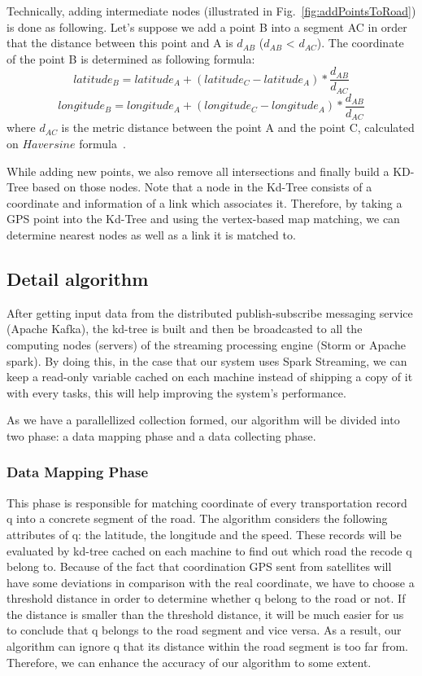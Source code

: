 \documentclass{acm_proc_article-sp}
\begin{document}
Technically, adding intermediate nodes (illustrated in Fig.~\ref{fig:addPointsToRoad}) is done as following. Let's suppose we add a point B into a segment AC in order that the distance between this point and A is $d_{AB}$ ($d_{AB}$ < $d_{AC}$). The coordinate of the point B is determined as following formula:
\[ latitude_{B} = latitude_{A} + (latitude_{C} - latitude_{A}) \ast \frac{d_{AB}}{d_{AC}}\]
\[ longitude_{B} = longitude_{A} + (longitude_{C} - longitude_{A}) \ast \frac{d_{AB}}{d_{AC}}\]
where $d_{AC}$ is the metric distance between the point A and the point C, calculated on $Haversine$ formula~\cite{haversineweb}.

While adding new points, we also remove all intersections and finally build a KD-Tree based on those nodes. Note that a node in the Kd-Tree consists of a coordinate and information of a link which associates it. Therefore, by taking a GPS point into the Kd-Tree and using the vertex-based map matching, we can determine nearest nodes as well as a link it is matched to.
	
\subsection{Detail algorithm}
		
After getting input data from the distributed publish-subscribe messaging service (Apache Kafka), the kd-tree is built and then be broadcasted to all the computing nodes (servers) of the streaming processing engine (Storm or Apache spark). By doing this, in the case that our system uses Spark Streaming, we can keep a read-only variable cached on each machine instead of shipping a copy of it with every tasks, this will help improving the system's performance.
	
As we have a parallellized collection formed, our algorithm will be divided into two phase: a data mapping phase and a data collecting phase. 

\subsubsection{Data Mapping Phase} 

This phase is responsible for matching coordinate of every transportation record q into a concrete segment of the road. The algorithm considers the following attributes of q: the latitude, the longitude and the speed. These records will be evaluated by kd-tree cached on each machine to find out which road the recode q belong to. Because of the fact that coordination GPS sent from satellites will have some deviations in comparison with the real coordinate, we have to choose a threshold distance in order to determine whether q belong to the road or not. If the distance is smaller than the threshold distance, it will be much easier for us to conclude that q belongs to the road segment and vice versa. As a result, our algorithm can ignore q that its distance within the road segment is too far from. Therefore, we can enhance the accuracy of our algorithm to some extent.
\end{document}

